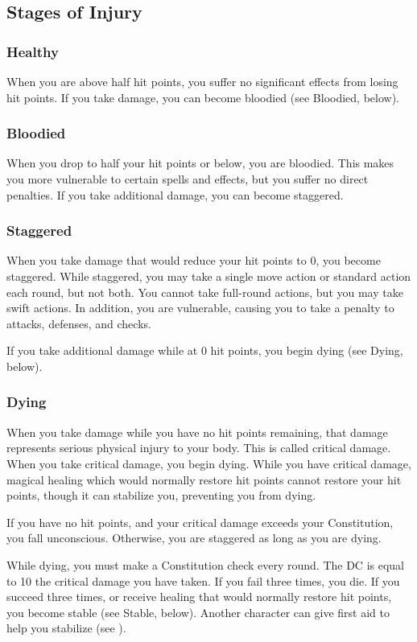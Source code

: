 \subsection{Stages of Injury}

\subsubsection{Healthy} 
When you are above half hit points, you suffer no significant effects from losing hit points. If you take damage, you can become bloodied (see Bloodied, below).

\subsubsection{Bloodied}
When you drop to half your hit points or below, you are bloodied. This makes you more vulnerable to certain spells and effects, but you suffer no direct penalties. If you take additional damage, you can become staggered.

\subsubsection{Staggered}
When you take damage that would reduce your hit points to 0, you become staggered. While staggered, you may take a single move action or standard action each round, but not both. You cannot take full-round actions, but you may take swift actions. In addition, you are vulnerable, causing you to take a  penalty to attacks, defenses, and checks.

If you take additional damage while at 0 hit points, you begin dying (see Dying, below).

\subsubsection{Dying}\label{Dying}
When you take damage while you have no hit points remaining, that damage represents serious physical injury to your body. This is called critical damage. When you take critical damage, you begin dying. While you have critical damage, magical healing which would normally restore hit points cannot restore your hit points, though it can stabilize you, preventing you from dying.

If you have no hit points, and your critical damage exceeds your Constitution, you fall unconscious. Otherwise, you are staggered as long as you are dying.

While dying, you must make a Constitution check every round. The DC is equal to 10 \add the critical damage you have taken. If you fail three times, you die. If you succeed three times, or receive healing that would normally restore hit points, you become stable (see Stable, below). Another character can give first aid to help you stabilize (see ).

